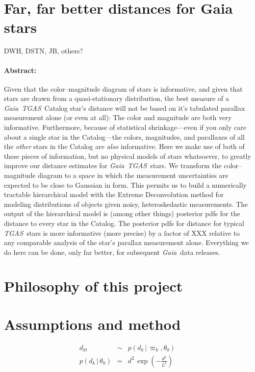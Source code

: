 \documentclass[12pt]{article}
\newcommand{\project}[1]{\textsl{#1}}
\newcommand{\acronym}[1]{\small{#1}}
\newcommand{\gaia}{\project{Gaia}}
\newcommand{\tgas}{\project{\acronym{TGAS}}}
\newcommand{\given}{\,|\,}
\begin{document}
\section*{Far, far better distances for Gaia stars}

\noindent
DWH, DSTN, JB, others?

\paragraph{Abstract:}
Given that the color--magnitude diagram of stars is informative, and
given that stars are drawn from a quasi-stationary distribution, the
best measure of a \gaia\ \tgas\ Catalog star's distance will not be based on
it's tabulated parallax measurement alone (or even at all):
The color and magnitude are both very informative.
Furthermore, because of statistical shrinkage---even if you
only care about a single star in the Catalog---the colors, magnitudes,
and parallaxes of all the \emph{other} stars in the Catalog are \emph{also}
informative.
Here we make use of both of these pieces of information, but no
physical models of stars whatsoever, to greatly improve our distance
estimates for \gaia\ \tgas\ stars.
We transform the color--magnitude diagram to a space in which the
measurement uncertainties are expected to be close to Gaussian in
form.
This permits us to build a numerically tractable hierarchical model
with the Extreme Deconvolution method for modeling distributions of
objects given noisy, heteroskedastic measurements.
The output of the hierarchical model is (among other things) posterior
pdfs for the distance to every star in the Catalog.
The posterior pdfs for distance for typical \tgas\ stars is more
informative (more precise) by a factor of XXX relative to any
comparable analysis of the star's parallax measurement alone.
Everything we do here can be done, only far better, for subsequent
\gaia\ data releases.

\section{Philosophy of this project}

\section{Assumptions and method}

\begin{eqnarray}
  d_{kt} &\sim& p(d_k\given\varpi_k,\theta_0)
  \\
  p(d_k\given\theta_0) &=& d^2\,\exp(-\frac{d^2}{L^2})
\end{eqnarray}
\end{document}
